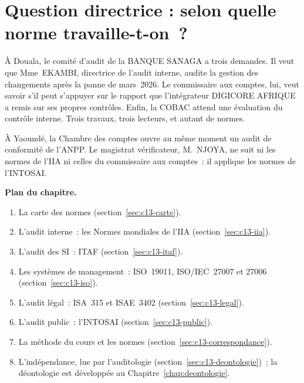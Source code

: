\bigskip

\section*{Question directrice : selon quelle norme travaille-t-on~?}

À Douala, le comité d'audit de la BANQUE SANAGA a trois demandes. Il veut
que Mme~EKAMBI, directrice de l'audit interne, audite la gestion des
changements après la panne de mars~2026. Le commissaire aux comptes, lui,
veut savoir s'il peut s'appuyer sur le rapport que l'intégrateur DIGICORE
AFRIQUE a remis sur ses propres contrôles. Enfin, la COBAC attend une
évaluation du contrôle interne. Trois travaux, trois lecteurs, et autant
de normes.

À Yaoundé, la Chambre des comptes ouvre au même moment un audit de
conformité de l'ANPP. Le magistrat vérificateur, M.~NJOYA, ne suit ni les
normes de l'IIA ni celles du commissaire aux comptes~: il applique les
normes de l'INTOSAI.

\medskip
\textbf{Plan du chapitre.}
\begin{enumerate}
    \item La carte des normes (section~\ref{sec:c13-carte}).
    \item L'audit interne~: les Normes mondiales de l'IIA
          (section~\ref{sec:c13-iia}).
    \item L'audit des SI~: ITAF (section~\ref{sec:c13-itaf}).
    \item Les systèmes de management~: ISO~19011, ISO/IEC~27007 et 27006
          (section~\ref{sec:c13-iso}).
    \item L'audit légal~: ISA~315 et ISAE~3402 (section~\ref{sec:c13-legal}).
    \item L'audit public~: l'INTOSAI (section~\ref{sec:c13-public}).
    \item La méthode du cours et les normes
          (section~\ref{sec:c13-correspondance}).
    \item L'indépendance, lue par l'auditologie
          (section~\ref{sec:c13-deontologie})~; la déontologie est
          développée au Chapitre~\ref{chap:deontologie}.
\end{enumerate}

\separateur

